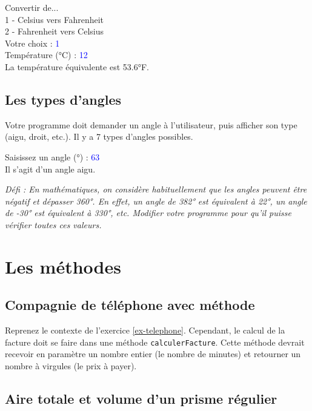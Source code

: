 \documentclass[12pt]{article}
\newenvironment{console}
	{
	\tcolorbox[title={Sortie console}, sharp corners = south, boxsep = 1.5mm]{} \tt
	}{\endtcolorbox}
\begin{document}
\begin{console}
Convertir de...\\
1 - Celsius vers Fahrenheit\\
2 - Fahrenheit vers Celsius\\[\baselineskip]
Votre choix : \textcolor{blue}{1}\\[\baselineskip]
Température (°C) : \textcolor{blue}{12}\\
La température équivalente est 53.6°F.
\end{console}

\subsection{Les types d'angles}

Votre programme doit demander un angle à l'utilisateur, puis afficher son type (aigu, droit, etc.). Il y a 7 types d'angles possibles. 

\begin{console}
Saisissez un angle (°) : \textcolor{blue}{63}\\
Il s'agit d'un angle aigu.
\end{console}

\textit{Défi : En mathématiques, on considère habituellement que les angles peuvent être négatif et dépasser 360°. En effet, un angle de 382° est équivalent à 22°, un angle de -30° est équivalent à 330°, etc. Modifier votre programme pour qu'il puisse vérifier toutes ces valeurs.}
%
%

\section{Les méthodes}

\subsection{Compagnie de téléphone avec méthode}

Reprenez le contexte de l'exercice \ref{ex-telephone}. Cependant, le calcul de la facture doit se faire dans une méthode \texttt{calculerFacture}. Cette méthode devrait recevoir en paramètre un nombre entier (le nombre de minutes) et retourner un nombre à virgules (le prix à payer).

\subsection{Aire totale et volume d'un prisme régulier}
\end{document}

